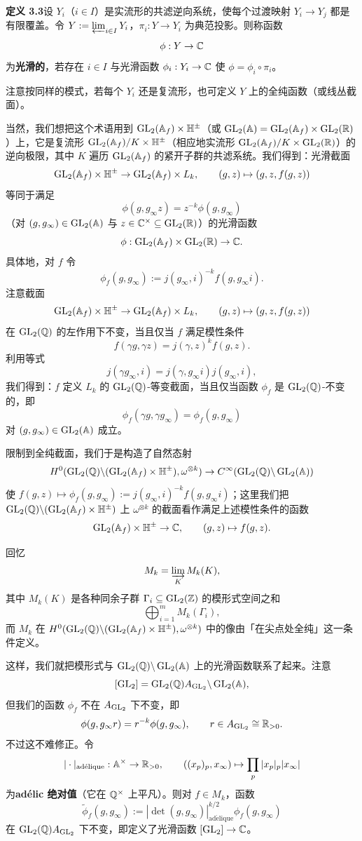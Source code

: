 \noindent\textbf{定义 3.3}\label{def:3.3}\quad 设 $Y_i$（$i\in I$）是实流形的共滤逆向系统，使每个过渡映射 $Y_i\to Y_j$ 都是有限覆盖。令 $Y:=\varprojlim_{i\in I}Y_i$，$\pi_i:Y\to Y_i$ 为典范投影。则称函数
\[
\phi:Y\to\mathbb{C}
\]
为\textbf{光滑的}，若存在 $i\in I$ 与光滑函数 $\phi_i:Y_i\to\mathbb{C}$ 使 $\phi=\phi_i\circ\pi_i$。

注意按同样的模式，若每个 $Y_i$ 还是复流形，也可定义 $Y$ 上的全纯函数（或线丛截面）。

当然，我们想把这个术语用到 $\operatorname{GL}_2(\mathbb{A}_f)\times\mathbb{H}^\pm$（或 $\operatorname{GL}_2(\mathbb{A})=\operatorname{GL}_2(\mathbb{A}_f)\times\operatorname{GL}_2(\mathbb{R})$）上，它是复流形 $\operatorname{GL}_2(\mathbb{A}_f)/K\times\mathbb{H}^\pm$（相应地实流形 $\operatorname{GL}_2(\mathbb{A}_f)/K\times\operatorname{GL}_2(\mathbb{R})$）的逆向极限，其中 $K$ 遍历 $\operatorname{GL}_2(\mathbb{A}_f)$ 的紧开子群的共滤系统。我们得到：光滑截面
\[
\operatorname{GL}_2(\mathbb{A}_f)\times\mathbb{H}^\pm\to\operatorname{GL}_2(\mathbb{A}_f)\times L_k,\qquad(g,z)\mapsto(g,z,f(g,z))
\]
等同于满足
\[
\phi(g,g_\infty z)=z^{-k}\phi(g,g_\infty)
\]
（对 $(g,g_\infty)\in\operatorname{GL}_2(\mathbb{A})$ 与 $z\in\mathbb{C}^\times\subseteq\operatorname{GL}_2(\mathbb{R})$）的光滑函数
\[
\phi:\operatorname{GL}_2(\mathbb{A}_f)\times\operatorname{GL}_2(\mathbb{R})\to\mathbb{C}.
\]
具体地，对 $f$ 令
\[
\phi_f(g,g_\infty):=j(g_\infty,i)^{-k}f(g,g_\infty i).
\]
注意截面
\[
\operatorname{GL}_2(\mathbb{A}_f)\times\mathbb{H}^\pm\to\operatorname{GL}_2(\mathbb{A}_f)\times L_k,\qquad(g,z)\mapsto(g,z,f(g,z))
\]
在 $\operatorname{GL}_2(\mathbb{Q})$ 的左作用下不变，当且仅当 $f$ 满足模性条件
\[
f(\gamma g,\gamma z)=j(\gamma,z)^kf(g,z).
\]
利用等式
\[
j(\gamma g_\infty,i)=j(\gamma,g_\infty i)j(g_\infty,i),
\]
我们得到：$f$ 定义 $L_k$ 的 $\operatorname{GL}_2(\mathbb{Q})$-等变截面，当且仅当函数 $\phi_f$ 是 $\operatorname{GL}_2(\mathbb{Q})$-不变的，即
\[
\phi_f(\gamma g,\gamma g_\infty)=\phi_f(g,g_\infty)
\]
对 $(g,g_\infty)\in\operatorname{GL}_2(\mathbb{A})$ 成立。

限制到全纯截面，我们于是构造了自然态射
\[
H^0(\operatorname{GL}_2(\mathbb{Q})\backslash(\operatorname{GL}_2(\mathbb{A}_f)\times\mathbb{H}^\pm),\omega^{\otimes k})\to C^\infty(\operatorname{GL}_2(\mathbb{Q})\backslash\operatorname{GL}_2(\mathbb{A}))
\]
使 $f(g,z)\mapsto\phi_f(g,g_\infty):=j(g_\infty,i)^{-k}f(g,g_\infty i)$；这里我们把 $\operatorname{GL}_2(\mathbb{Q})\backslash(\operatorname{GL}_2(\mathbb{A}_f)\times\mathbb{H}^\pm)$ 上 $\omega^{\otimes k}$ 的截面看作满足上述模性条件的函数
\[
\operatorname{GL}_2(\mathbb{A}_f)\times\mathbb{H}^\pm\to\mathbb{C},\qquad(g,z)\mapsto f(g,z).
\]

回忆
\[
M_k=\varinjlim_KM_k(K),
\]
其中 $M_k(K)$ 是各种同余子群 $\Gamma_i\subseteq\operatorname{GL}_2(\mathbb{Z})$ 的模形式空间之和
\[
\bigoplus_{i=1}^mM_k(\Gamma_i),
\]
而 $M_k$ 在 $H^0(\operatorname{GL}_2(\mathbb{Q})\backslash(\operatorname{GL}_2(\mathbb{A}_f)\times\mathbb{H}^\pm),\omega^{\otimes k})$ 中的像由「在尖点处全纯」这一条件定义。

这样，我们就把模形式与 $\operatorname{GL}_2(\mathbb{Q})\backslash\operatorname{GL}_2(\mathbb{A})$ 上的光滑函数联系了起来。注意
\[
[\operatorname{GL}_2]=\operatorname{GL}_2(\mathbb{Q})A_{\operatorname{GL}_2}\backslash\operatorname{GL}_2(\mathbb{A}),
\]
但我们的函数 $\phi_f$ 不在 $A_{\operatorname{GL}_2}$ 下不变，即
\[
\phi(g,g_\infty r)=r^{-k}\phi(g,g_\infty),\qquad r\in A_{\operatorname{GL}_2}\cong\mathbb{R}_{>0}.
\]
不过这不难修正。令
\[
|\cdot|_{\mathrm{ad\acute{e}lique}}:\mathbb{A}^\times\to\mathbb{R}_{>0},\qquad((x_p)_p,x_\infty)\mapsto\prod_p|x_p|_p|x_\infty|
\]
为\textbf{adélic 绝对值}（它在 $\mathbb{Q}^\times$ 上平凡）。则对 $f\in M_k$，函数
\[
\widetilde\phi_f(g,g_\infty):=|\det(g,g_\infty)|^{k/2}_{\mathrm{ad\acute{e}lique}}\phi_f(g,g_\infty)
\]
在 $\operatorname{GL}_2(\mathbb{Q})A_{\operatorname{GL}_2}$ 下不变，即定义了光滑函数 $[\operatorname{GL}_2]\to\mathbb{C}$。


